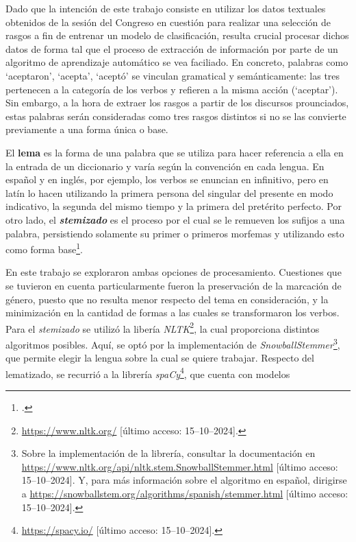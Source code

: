 Dado que la intenci\'on de este trabajo consiste en utilizar los datos textuales
obtenidos de la sesi\'on del Congreso en cuesti\'on para realizar una selecci\'on
de rasgos a fin de entrenar un modelo de clasificaci\'on, resulta crucial procesar dichos
datos de forma tal que el proceso de extracci\'on de informaci\'on por parte
de un algoritmo de aprendizaje autom\'atico se vea faciliado. En concreto, palabras
como `aceptaron', `acepta', `acept\'o' se vinculan gramatical y sem\'anticamente:
las tres pertenecen a la categor\'ia de los verbos y refieren a la misma acci\'on (`aceptar').
Sin embargo, a la hora de extraer los rasgos a partir de los discursos prounciados,
estas palabras ser\'an consideradas como tres rasgos distintos si no se las convierte
previamente a una forma \'unica o base.
\par
El \textbf{lema} es la forma de una palabra que se utiliza para hacer referencia a ella
en la entrada de un diccionario y var\'ia seg\'un la convenci\'on en cada lengua. En español
y en ingl\'es, por ejemplo, los verbos se enuncian en infinitivo, pero en lat\'in lo hacen
utilizando la primera persona del singular del presente en modo indicativo, la segunda
del mismo tiempo y la primera del pret\'erito perfecto. Por otro lado, el
\textbf{\textit{stemizado}} es el proceso por el cual se le remueven los sufijos
a una palabra, persistiendo solamente su primer o primeros morfemas y utilizando
esto como forma base\footnote{\citet[Cap\'itulo~3]{bird2009natural}.}.
\par
En este trabajo se exploraron ambas opciones de procesamiento. Cuestiones que se tuvieron
en cuenta particularmente fueron la preservaci\'on de la marcaci\'on de g\'enero, puesto que
no resulta menor respecto del tema en consideraci\'on, y la minimizaci\'on en la cantidad de formas a las
cuales se transformaron los verbos. Para el \textit{stemizado} se utiliz\'o la
liber\'ia \textit{NLTK}\footnote{\url{https://www.nltk.org/} [\'ultimo acceso: 15--10--2024].},
la cual proporciona distintos algoritmos posibles. Aqu\'i, se opt\'o por la
implementaci\'on de \textit{SnowballStemmer}\footnote{Sobre la implementaci\'on de la
librer\'ia, consultar la documentaci\'on en
\url{https://www.nltk.org/api/nltk.stem.SnowballStemmer.html}
[\'ultimo acceso: 15--10--2024]. Y, para m\'as informaci\'on
sobre el algoritmo en español, dirigirse a
\url{https://snowballstem.org/algorithms/spanish/stemmer.html}
[\'ultimo acceso: 15--10--2024].}, que permite elegir
la lengua sobre la cual se quiere trabajar. Respecto del lematizado, se recurri\'o
a la librer\'ia \textit{spaCy}\footnote{\url{https://spacy.io/}
[\'ultimo acceso: 15--10--2024].}, que cuenta con modelos
